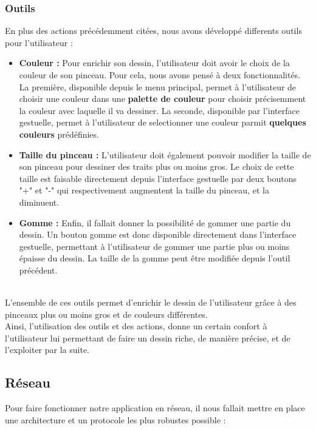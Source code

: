 \documentclass{report}
\begin{document}
			\subsubsection{Outils}
				En plus des actions précédemment citées, nous avons développé differents outils pour l'utilisateur : \\
				\begin{itemize}
					\item \textbf{Couleur :} Pour enrichir son dessin, l'utilisateur doit avoir le choix de la couleur de son pinceau. Pour cela, nous avons pensé à deux fonctionnalités. La première, disponible depuis le menu principal, permet à l'utilisateur de choisir une couleur dans une \textbf{palette de couleur} pour choisir précisemment la couleur avec laquelle il va dessiner. La seconde, disponible par l'interface gestuelle, permet à l'utilisateur de selectionner une couleur parmit \textbf{quelques couleurs} prédéfinies. 
					\item \textbf{Taille du pinceau :} L'utilisateur doit également pouvoir modifier la taille de son pinceau pour dessiner des traits plus ou moins gros. Le choix de cette taille est faisable directement depuis l'interface gestuelle par deux boutons "+" et "-" qui respectivement augmentent la taille du pinceau, et la diminuent.
					\item \textbf{Gomme :} Enfin, il fallait donner la possibilité de gommer une partie du dessin. Un bouton gomme est donc disponible directement dans l'interface gestuelle, permettant à l'utilisateur de gommer une partie plus ou moins épaisse du dessin. La taille de la gomme peut être modifiée depuis l'outil précédent.
				\end{itemize} \ \\
				
				L'ensemble de ces outils permet d'enrichir le dessin de l'utilisateur grâce à des pinceaux plus ou moins gros et de couleurs différentes. \\
				Ainsi, l'utilisation des outils et des actions, donne un certain confort à l'utilisateur lui permettant de faire un dessin riche, de manière précise, et de l'exploiter par la suite.
		\subsection{Réseau}
			Pour faire fonctionner notre application en réseau, il nous fallait mettre en place une architecture et un protocole les plus robustes possible :
\end{document}
